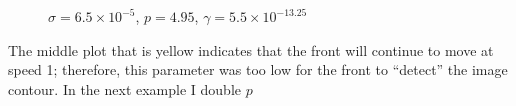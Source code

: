 \documentclass[margin=1in,12pt,3p]{elsarticle}
\begin{document}
\begin{figure}[h!]
  \centering
  \hfill
  \\
  \\
  \caption{$\sigma = 6.5\times 10^{-5}$, $p = 4.95$, $\gamma=5.5\times 10^{-13.25}$}
\end{figure}
The middle plot that is yellow indicates that the front will continue to move at speed 1; therefore, this parameter was too low for the front to ``detect'' the image contour. In the next example I double $p$
\clearpage
\end{document}

